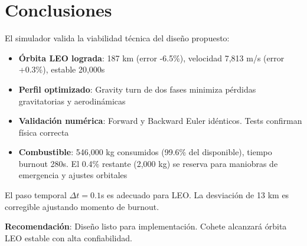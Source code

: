 \documentclass[10pt,a4paper]{article}
\begin{document}
\section{Conclusiones}

El simulador valida la viabilidad técnica del diseño propuesto:

\begin{itemize}
    \item \textbf{Órbita LEO lograda}: 187 km (error -6.5\%), velocidad 7,813 m/s (error +0.3\%), estable 20,000s
    \item \textbf{Perfil optimizado}: Gravity turn de dos fases minimiza pérdidas gravitatorias y aerodinámicas
    \item \textbf{Validación numérica}: Forward y Backward Euler idénticos. Tests confirman física correcta
    \item \textbf{Combustible}: 546,000 kg consumidos (99.6\% del disponible), tiempo burnout 280s. El 0.4\% restante (2,000 kg) se reserva para maniobras de emergencia y ajustes orbitales
\end{itemize}

El paso temporal $\Delta t = 0.1$s es adecuado para LEO. La desviación de 13 km es corregible ajustando momento de burnout.

\noindent\textbf{Recomendación}: Diseño listo para implementación. Cohete alcanzará órbita LEO estable con alta confiabilidad.
\end{document}
